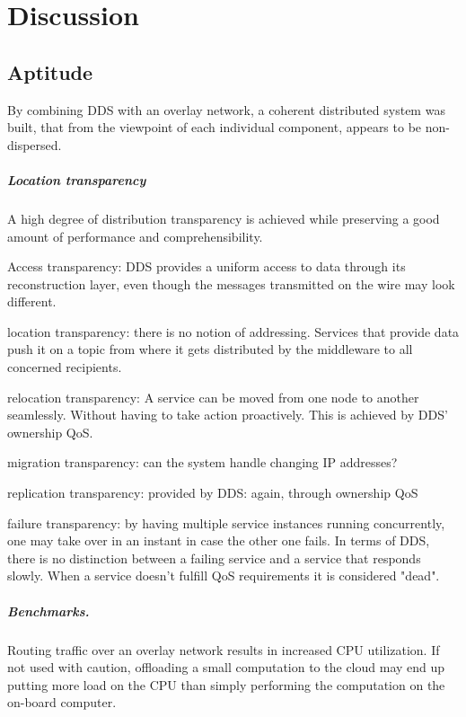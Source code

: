 \chapter{Discussion}\label{chapter:discussion}

\section{Aptitude}

By combining DDS with an overlay network, a coherent distributed system \cite{tanenbaum2017distributed} was built, that from the viewpoint of each individual component, appears to be non-dispersed.


\paragraph{Location transparency}
A high degree of distribution transparency is achieved while preserving a good amount of performance and comprehensibility.

Access transparency: DDS provides a uniform access to data through its reconstruction layer, even though the messages transmitted on the wire may look different.

location transparency: there is no notion of addressing. Services that provide data push it on a topic from where it gets distributed by the middleware to all concerned recipients.

relocation transparency: A service can be moved from one node to another seamlessly. Without having to take action proactively. This is achieved by DDS' ownership QoS.

migration transparency: can the system handle changing IP addresses?

replication transparency: provided by DDS: again, through ownership QoS

failure transparency: by having multiple service instances running concurrently, one may take over in an instant in case the other one fails. In terms of DDS, there is no distinction between a failing service and a service that responds slowly. When a service doesn't fulfill QoS requirements it is considered "dead".

\paragraph{Benchmarks.}
Routing traffic over an overlay network results in increased CPU utilization. If not used with caution, offloading a small computation to the cloud may end up putting more load on the CPU than simply performing the computation on the on-board computer.



